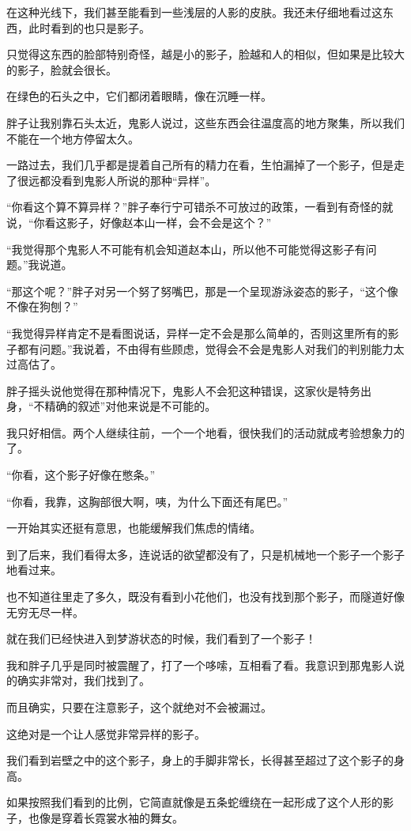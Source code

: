 在这种光线下，我们甚至能看到一些浅层的人影的皮肤。我还未仔细地看过这东西，此时看到的也只是影子。

只觉得这东西的脸部特别奇怪，越是小的影子，脸越和人的相似，但如果是比较大的影子，脸就会很长。

在绿色的石头之中，它们都闭着眼睛，像在沉睡一样。

胖子让我别靠石头太近，鬼影人说过，这些东西会往温度高的地方聚集，所以我们不能在一个地方停留太久。

一路过去，我们几乎都是提着自己所有的精力在看，生怕漏掉了一个影子，但是走了很远都没看到鬼影人所说的那种“异样”。

“你看这个算不算异样？”胖子奉行宁可错杀不可放过的政策，一看到有奇怪的就说，“你看这影子，好像赵本山一样，会不会是这个？”

“我觉得那个鬼影人不可能有机会知道赵本山，所以他不可能觉得这影子有问题。”我说道。

“那这个呢？”胖子对另一个努了努嘴巴，那是一个呈现游泳姿态的影子，“这个像不像在狗刨？”

“我觉得异样肯定不是看图说话，异样一定不会是那么简单的，否则这里所有的影子都有问题。”我说着，不由得有些顾虑，觉得会不会是鬼影人对我们的判别能力太过高估了。

胖子摇头说他觉得在那种情况下，鬼影人不会犯这种错误，这家伙是特务出身，“不精确的叙述”对他来说是不可能的。

我只好相信。两个人继续往前，一个一个地看，很快我们的活动就成考验想象力的了。

“你看，这个影子好像在憋条。”

“你看，我靠，这胸部很大啊，咦，为什么下面还有尾巴。”

一开始其实还挺有意思，也能缓解我们焦虑的情绪。

到了后来，我们看得太多，连说话的欲望都没有了，只是机械地一个影子一个影子地看过来。

也不知道往里走了多久，既没有看到小花他们，也没有找到那个影子，而隧道好像无穷无尽一样。

就在我们已经快进入到梦游状态的时候，我们看到了一个影子！

我和胖子几乎是同时被震醒了，打了一个哆嗦，互相看了看。我意识到那鬼影人说的确实非常对，我们找到了。

而且确实，只要在注意影子，这个就绝对不会被漏过。

这绝对是一个让人感觉非常异样的影子。

我们看到岩壁之中的这个影子，身上的手脚非常长，长得甚至超过了这个影子的身高。

如果按照我们看到的比例，它简直就像是五条蛇缠绕在一起形成了这个人形的影子，也像是穿着长霓裳水袖的舞女。

